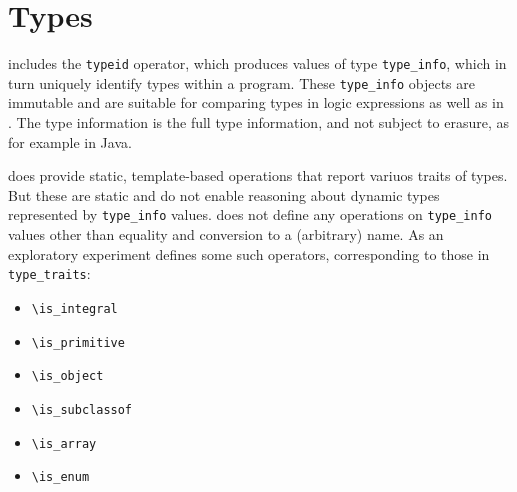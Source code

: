 \section{Types}
\label{sec:type}
\experimental

\lang includes the \lstinline|typeid| operator, which produces values of
type \lstinline|type_info|, which in turn uniquely identify types within
a \lang program. These \lstinline|type_info| objects are immutable and are suitable for comparing types in logic expressions as well as in \lang.
The type information is the full type information, and not subject to erasure,
as for example in Java.

\lang does provide static, template-based operations that report variuos traits of types. But these are static and do not enable reasoning about 
dynamic types represented by \lstinline|type_info| values.
\lang does not define any operations on \lstinline|type_info| values other than equality and conversion to a (arbitrary) name. As an exploratory experiment
\NAME defines some such operators, corresponding to those in \lstinline|type_traits|:
\begin{itemize}
\item  \lstinline|\is_integral|
\item \lstinline|\is_primitive|
\item \lstinline|\is_object|
\item \lstinline|\is_subclassof|
\item \lstinline|\is_array|
\item \lstinline|\is_enum|
\end{itemize}
